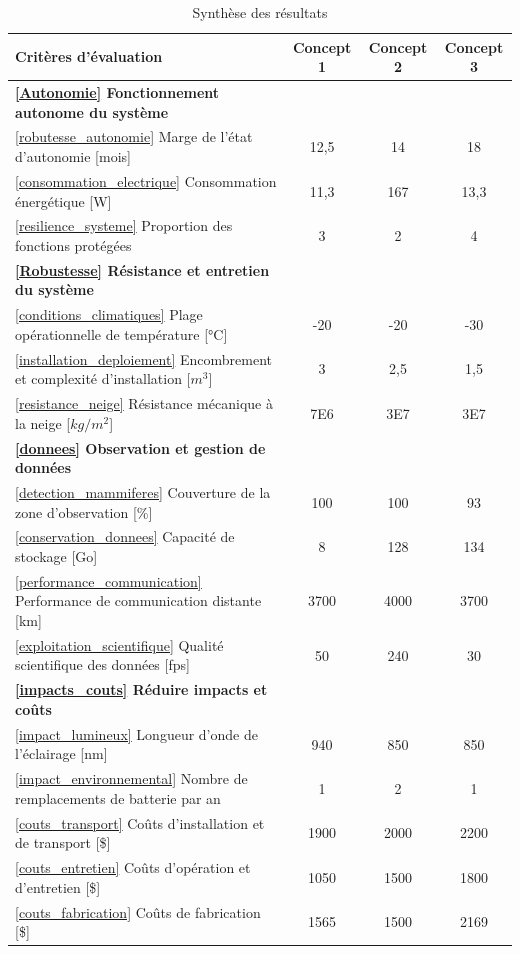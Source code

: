 \begin{table}[h!]
\centering
\caption{Synthèse des résultats}
\label{tab:synth}
\small
\renewcommand{\arraystretch}{1.2}
\begin{tabularx}{\textwidth}{|X|c|c|c|}
\hline
\textbf{Critères d'évaluation} & \textbf{Concept 1} & \textbf{Concept 2} & \textbf{Concept 3} \\
\hline

\textbf{\ref{Autonomie} Fonctionnement autonome du système} & & &  \\
\hline
\ref{robutesse_autonomie} Marge de l'état d'autonomie [mois] & 12,5 & 14 & 18 \\
\ref{consommation_electrique} Consommation énergétique [W] & 11,3 & 167 & 13,3 \\
\ref{resilience_systeme} Proportion des fonctions protégées & 3 & 2 & 4 \\
\hline

\textbf{\ref{Robustesse} Résistance et entretien du système} & & &  \\
\hline
\ref{conditions_climatiques} Plage opérationnelle de température [°C] & -20 & -20 & -30 \\
\ref{installation_deploiement} Encombrement et complexité d’installation [$m^3$] & 3 & 2,5 & 1,5 \\
\ref{resistance_neige} Résistance mécanique à la neige [$kg/m^2$] & 7E6 & 3E7 & 3E7 \\
\hline

\textbf{\ref{donnees} Observation et gestion de données} & & & \\
\hline
\ref{detection_mammiferes} Couverture de la zone d’observation [\%] & 100 & 100 & 93 \\
\ref{conservation_donnees} Capacité de stockage [Go] & 8 & 128 & 134 \\
\ref{performance_communication} Performance de communication distante [km] & 3700 & 4000 & 3700 \\
\ref{exploitation_scientifique} Qualité scientifique des données [fps] & 50 & 240 & 30 \\
\hline

\textbf{\ref{impacts_couts} Réduire impacts et coûts} & & &  \\
\hline
\ref{impact_lumineux} Longueur d'onde de l'éclairage [nm] & 940 & 850 & 850 \\
\ref{impact_environnemental} Nombre de remplacements de batterie par an & 1 & 2 & 1 \\
\ref{couts_transport} Coûts d'installation et de transport [\$] & 1900 & 2000 & 2200 \\
\ref{couts_entretien} Coûts d'opération et d’entretien [\$] & 1050 & 1500 & 1800 \\
\ref{couts_fabrication} Coûts de fabrication [\$] & 1565 & 1500 & 2169 \\
\hline

\end{tabularx}
\end{table}
